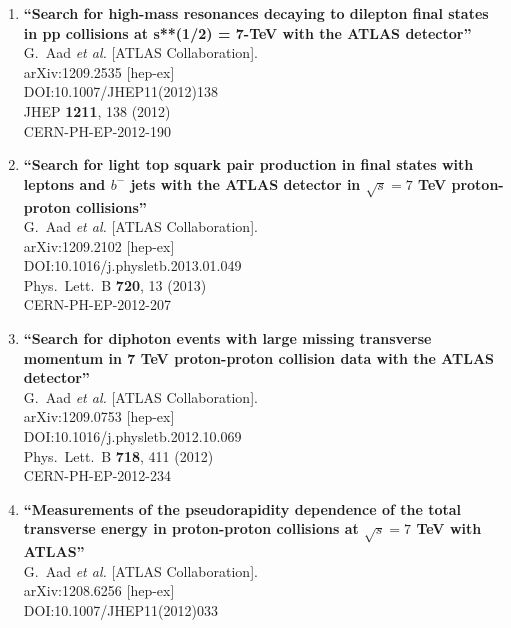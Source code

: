 \documentclass{article}
\begin{document}
\begin{enumerate}
\item%
{\bf ``Search for high-mass resonances decaying to dilepton final states in pp collisions at s**(1/2) = 7-TeV with the ATLAS detector''}
  \\{}G.~Aad {\it et al.} [ATLAS Collaboration].
  \\{}arXiv:1209.2535 [hep-ex]
  \\{}DOI:10.1007/JHEP11(2012)138
  \\{}JHEP {\bf 1211}, 138 (2012)
  \\{}CERN-PH-EP-2012-190
\item%
{\bf ``Search for light top squark pair production in final states with leptons and $b^-$ jets with the ATLAS detector in $\sqrt{s}=7$ TeV proton-proton collisions''}
  \\{}G.~Aad {\it et al.} [ATLAS Collaboration].
  \\{}arXiv:1209.2102 [hep-ex]
  \\{}DOI:10.1016/j.physletb.2013.01.049
  \\{}Phys.\ Lett.\ B {\bf 720}, 13 (2013)
  \\{}CERN-PH-EP-2012-207
\item%
{\bf ``Search for diphoton events with large missing transverse momentum in 7 TeV proton-proton collision data with the ATLAS detector''}
  \\{}G.~Aad {\it et al.} [ATLAS Collaboration].
  \\{}arXiv:1209.0753 [hep-ex]
  \\{}DOI:10.1016/j.physletb.2012.10.069
  \\{}Phys.\ Lett.\ B {\bf 718}, 411 (2012)
  \\{}CERN-PH-EP-2012-234
\item%
{\bf ``Measurements of the pseudorapidity dependence of the total transverse energy in proton-proton collisions at $\sqrt{s}=7$ TeV with ATLAS''}
  \\{}G.~Aad {\it et al.} [ATLAS Collaboration].
  \\{}arXiv:1208.6256 [hep-ex]
  \\{}DOI:10.1007/JHEP11(2012)033

\end{enumerate}
\end{document}
